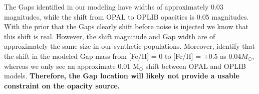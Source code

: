 The Gaps identified in our modeling have widths of approximately 0.03
magnitudes, while the shift from OPAL to OPLIB opacities is 0.05 magnitudes.
With the prior that the Gaps clearly shift before noise is injected we know
that this shift is real. However, the shift magnitude and Gap width are of
approximately the same size in our synthetic populations. Moreover,
\citet{Feiden2021} identify that the shift in the modeled Gap mass from [Fe/H]
= 0 to [Fe/H] = +0.5 as 0.04$M_{\odot}$, whereas we only see an approximate
$0.01$ M$_{\odot}$ shift between OPAL and OPLIB models. \textbf{Therefore, the
Gap location will likely not provide a usable constraint on the opacity
source.} 
